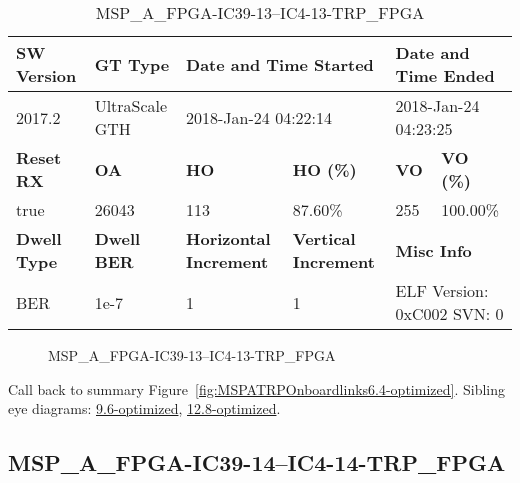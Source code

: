 \begin{table}[h]
\centering
\caption{MSP\_A\_FPGA-IC39-13--IC4-13-TRP\_FPGA}
\label{tab:MSPAFPGAIC3913IC413TRPFPGA6.4-optimized}
\begin{tabular}{@{}|l|l|l|l|l|l|@{}}
\toprule
\textbf{SW Version}                & \textbf{GT Type}   & \multicolumn{2}{l|}{\textbf{Date and Time Started}}            & \multicolumn{2}{l|}{\textbf{Date and Time Ended}}        \\ \midrule
2017.2                       & UltraScale GTH          & \multicolumn{2}{l|}{2018-Jan-24 04:22:14}                   & \multicolumn{2}{l|}{2018-Jan-24 04:23:25}               \\ \midrule
\textbf{Reset RX}                  & \textbf{OA} & \textbf{HO}   & \textbf{HO (\%)} & \textbf{VO} & \textbf{VO (\%)} \\ \midrule
true & 26043        & 113          & 87.60\%        & 255        & 100.00\%       \\ \midrule
\textbf{Dwell Type}                & \textbf{Dwell BER} & \textbf{Horizontal Increment} & \textbf{Vertical Increment}    & \multicolumn{2}{l|}{\textbf{Misc Info}}                  \\ \midrule
BER                            & 1e-7        & 1        & 1           & \multicolumn{2}{l|}{ELF Version: 0xC002 SVN: 0}                         \\ \bottomrule
\end{tabular}
\end{table}

\begin{figure}[h]
\caption{MSP\_A\_FPGA-IC39-13--IC4-13-TRP\_FPGA} \label{fig:MSPAFPGAIC3913IC413TRPFPGA6.4-optimized}
\end{figure}

Call back to summary Figure~\ref{fig:MSPATRPOnboardlinks6.4-optimized}.
Sibling eye diagrams: \hyperref[sec:MSPAFPGAIC3913IC413TRPFPGA9.6-optimized]{9.6-optimized}, \hyperref[sec:MSPAFPGAIC3913IC413TRPFPGA12.8-optimized]{12.8-optimized}.

\clearpage
\newpage


\subsection{MSP\_A\_FPGA-IC39-14--IC4-14-TRP\_FPGA}\label{sec:MSPAFPGAIC3914IC414TRPFPGA6.4-optimized}

